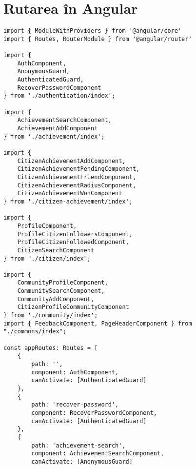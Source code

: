\section{Rutarea în Angular}
\begin {lstlisting}
import { ModuleWithProviders } from '@angular/core'
import { Routes, RouterModule } from '@angular/router'

import {
    AuthComponent,
    AnonymousGuard,
    AuthenticatedGuard,
    RecoverPasswordComponent
} from './authentication/index';

import {
    AchievementSearchComponent,
    AchievementAddComponent
} from './achievement/index';

import {
    CitizenAchievementAddComponent,
    CitizenAchievementPendingComponent,
    CitizenAchievementFriendComponent,
    CitizenAchievementRadiusComponent,
    CitizenAchievementWonComponent
} from './citizen-achievement/index';

import {
    ProfileComponent,
    ProfileCitizenFollowersComponent,
    ProfileCitizenFollowedComponent,
    CitizenSearchComponent
} from "./citizen/index";

import {
    CommunityProfileComponent,
    CommunitySearchComponent,
    CommunityAddComponent,
    CitizenProfileCommunityComponent
} from './community/index';
import { FeedbackComponent, PageHeaderComponent } from "./commons/index";

const appRoutes: Routes = [
    {
        path: '',
        component: AuthComponent,
        canActivate: [AuthenticatedGuard]
    },
    {
        path: 'recover-password',
        component: RecoverPasswordComponent,
        canActivate: [AuthenticatedGuard]
    },
    {
        path: 'achievement-search',
        component: AchievementSearchComponent,
        canActivate: [AnonymousGuard]


\end{lstlisting}
